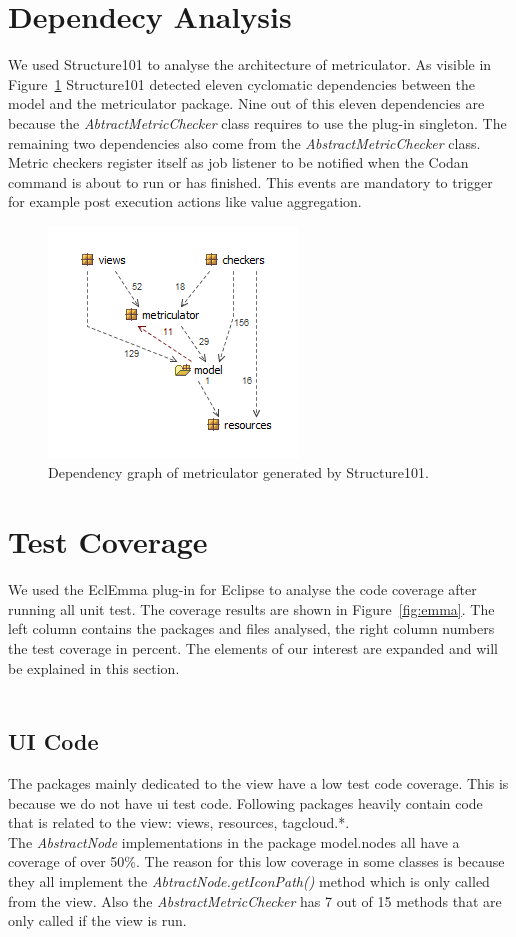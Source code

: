 \documentclass[11pt,a4paper,oneside]{scrreprt}
\begin{document}
\section{Dependecy Analysis}
We used Structure101 to analyse the architecture of metriculator. As visible in Figure~\ref{fig:structure101} Structure101 detected eleven cyclomatic dependencies between the model and the metriculator package. Nine out of this eleven dependencies are because the \textit{AbtractMetricChecker} class requires to use the plug-in singleton. The remaining two dependencies also come from the \textit{AbstractMetricChecker} class. Metric checkers register itself as job listener to be notified when the Codan command is about to run or has finished. This events are mandatory to trigger for example post execution actions like value aggregation.

\begin{figure}[th]
\begin{center}
\includegraphics[scale=0.5]{figures/structure101_composition.png}
\end{center}
\caption{Dependency graph of metriculator generated by Structure101.}
\label{fig:structure101}
\end{figure}

\section{Test Coverage}
We used the EclEmma plug-in for Eclipse \cite{emma} to analyse the code coverage after running all unit test. The coverage results are shown in Figure~\ref{fig:emma}. The left column contains the packages and files analysed, the right column numbers the test coverage in percent. The elements of our interest are expanded and will be explained in this section.
\\\\
\subsection{UI Code}
The packages mainly dedicated to the view have a low test code coverage. This is because we do not have ui test code. Following packages heavily contain code that is related to the view: views, resources, tagcloud.*.\\
The \textit{AbstractNode} implementations in the package model.nodes all have a coverage of over 50\%. The reason for this low coverage in some classes is because they all implement the \textit{AbtractNode.getIconPath()} method which is only called from the view. Also the \textit{AbstractMetricChecker} has 7 out of 15 methods that are only called if the view is run.
\end{document}
